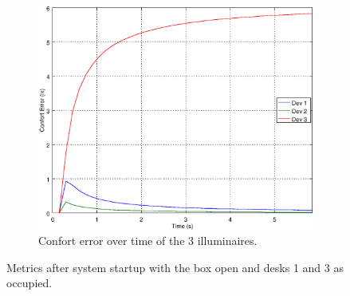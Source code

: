 \begin{figure}[ht]
\begin{subfigure}[t]{0.3\textwidth}
    \centering
    \includegraphics[width=.95\textwidth]{img/n_open_o101}
    \caption{Confort error over time of the 3 illuminaires.}
    \label{fig:n_open_o101}
    \end{subfigure}
    \caption{Metrics after system startup with the box open and desks 1 and 3 as occupied.}
\end{figure}


